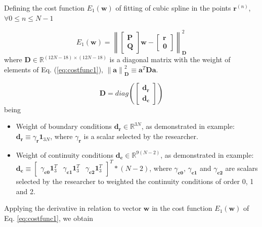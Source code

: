 Defining the cost function $E_{1}(\mathbf{w})$ of fitting of cubic spline in the points $\mathbf{r}^{(n)}$,
$\forall 0\leq n\leq N-1$

\begin{equation}\label{eq:costfunc1}
E_{1}(\mathbf{w})
=
\left\|
\begin{bmatrix}
\mathbf{P}\\
\mathbf{Q}
\end{bmatrix}
\mathbf{w}
-
\begin{bmatrix}
\mathbf{r}\\
\mathbf{0}
\end{bmatrix}
\right\|_{\mathbf{D}}^{2}
\end{equation}
where $\mathbf{D}\in \mathbb{R}^{(12N-18)\times(12N-18)}$ is a diagonal matrix with the weight of elements of Eq. (\ref{eq:costfunc1}), 
$\left\|\mathbf{a}\right\|_{\mathbf{D}}^{2}\equiv \mathbf{a}^{T}\mathbf{D}\mathbf{a}$.

\begin{equation}
\mathbf{D} 
= 
diag(
\begin{bmatrix}
\mathbf{d}_{\mathbf{r}}\\
\mathbf{d}_{\mathbf{c}}
\end{bmatrix}
)
\end{equation}
being
\begin{itemize}
\item Weight of boundary conditions $\mathbf{d}_{\mathbf{r}} \in \mathbb{R}^{3N}$, 
as demonstrated in example: $\mathbf{d}_{\mathbf{r}} \equiv \gamma_{\mathbf{r}} \mathbf{1}_{3N}$, where $\gamma_{\mathbf{r}}$ is a scalar selected by the researcher.
\item Weight of continuity conditions $\mathbf{d}_{\mathbf{c}} \in \mathbb{R}^{9(N-2)}$,
as demonstrated in example: 
$\mathbf{d}_{\mathbf{c}} \equiv \begin{bmatrix}\gamma_{\mathbf{c0}} \mathbf{1}_{3}^{T} & \gamma_{\mathbf{c1}} \mathbf{1}_{3}^{T} & \gamma_{\mathbf{c2}} \mathbf{1}_{3}^{T} \end{bmatrix}^{T} * (N-2)$, 
where $\gamma_{\mathbf{c0}}$, $\gamma_{\mathbf{c1}}$ and $\gamma_{\mathbf{c2}}$ are scalars selected by the researcher 
to weighted the continuity conditions of order 0, 1 and 2.
\end{itemize}


Applying the derivative in relation to vector $\mathbf{w}$
\cite[pp. 11]{petersen2008matrix}
in the cost function $E_{1}(\mathbf{w})$ of Eq. \ref{eq:costfunc1}, 
we obtain

